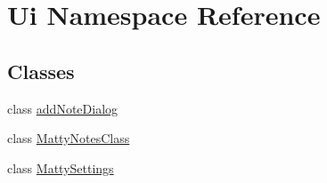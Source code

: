 \hypertarget{namespaceUi}{}\section{Ui Namespace Reference}
\label{namespaceUi}
\subsection*{Classes}
\begin{DoxyCompactItemize}
\item 
class \hyperlink{classUi_1_1addNoteDialog}{add\+Note\+Dialog}
\item 
class \hyperlink{classUi_1_1MattyNotesClass}{Matty\+Notes\+Class}
\item 
class \hyperlink{classUi_1_1MattySettings}{Matty\+Settings}
\end{DoxyCompactItemize}
